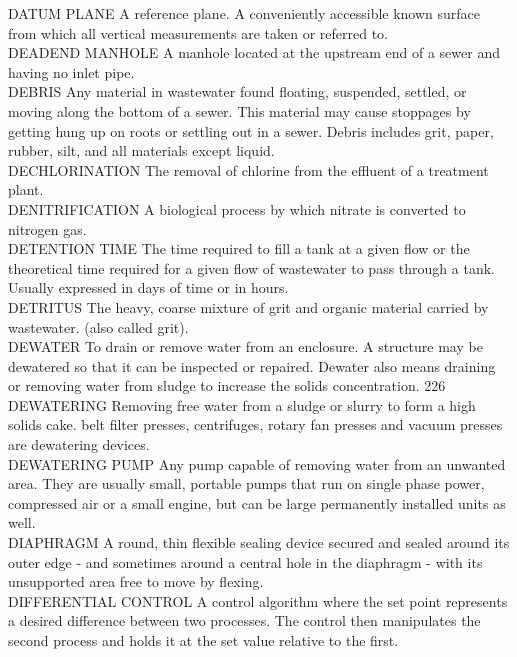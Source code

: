 \documentclass{article}
\begin{document}
DATUM PLANE
A reference plane.   A conveniently accessible known surface from which all vertical measurements are taken or referred to.
\vspace{0.3cm}\\
DEADEND MANHOLE
A manhole located at the upstream end of a sewer and having no inlet pipe. 
\vspace{0.3cm}\\
DEBRIS
Any material in wastewater found floating, suspended, settled, or moving along the bottom of a sewer. This material may cause stoppages by getting hung up on roots or settling out in a sewer. Debris includes grit, paper, rubber, silt, and all materials except liquid. 
\vspace{0.3cm}\\
DECHLORINATION
The removal of chlorine from the effluent of a treatment plant.
\vspace{0.3cm}\\
DENITRIFICATION
A biological process by which nitrate is converted to nitrogen gas.
\vspace{0.3cm}\\
DETENTION TIME
The time required to fill a tank at a given flow or the theoretical time required for a given flow of wastewater to pass through a tank.  Usually expressed in days of time or in hours.
\vspace{0.3cm}\\
DETRITUS
The heavy, coarse mixture of grit and organic material carried by wastewater. (also called grit).
\vspace{0.3cm}\\
DEWATER
To drain or remove water from an enclosure. A structure may be dewatered so that it can be inspected or repaired. Dewater also means draining or removing water from sludge to increase the solids concentration. 226 
\vspace{0.3cm}\\
DEWATERING
Removing free water from a sludge or slurry to form a high solids cake. belt filter presses, centrifuges, rotary fan presses and vacuum presses are dewatering devices.
\vspace{0.3cm}\\
DEWATERING PUMP
Any pump capable of removing water from an unwanted area. They are usually small, portable pumps that run on single phase power, compressed air or a small engine, but can be large permanently installed units as well.
\vspace{0.3cm}\\
DIAPHRAGM
A round, thin flexible sealing device secured and sealed around its outer edge - and sometimes around a central hole in the diaphragm - with its unsupported area free to move by flexing.
\vspace{0.3cm}\\
DIFFERENTIAL CONTROL
A control algorithm where the set point represents a desired difference between two processes. The control then manipulates the second process and holds it at the set value relative to the first.
\vspace{0.3cm}\\
\end{document}

